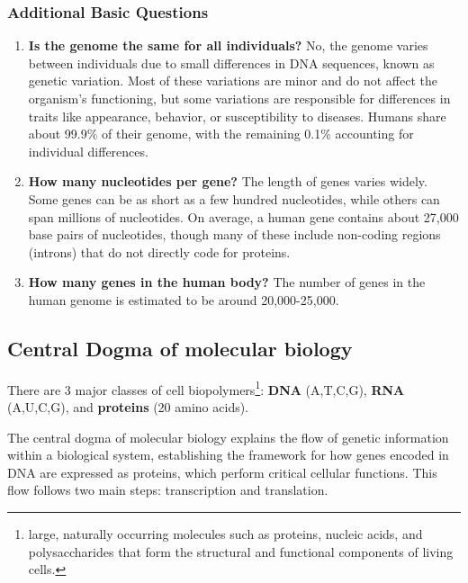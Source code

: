 \documentclass[a4paper]{article}
\begin{document}
\subsubsection*{Additional Basic Questions}
\begin{enumerate}
  \item \textbf{Is the genome the same for all individuals?} 
  No, the genome varies between individuals due to small differences in DNA sequences, 
  known as genetic variation. Most of these variations are minor and do 
  not affect the organism's functioning, but some variations are responsible 
  for differences in traits like appearance, behavior, or susceptibility to 
  diseases. Humans share about 99.9\% of their genome, with the remaining 0.1\% 
  accounting for individual differences.

  \item \textbf{How many nucleotides per gene?}
  The length of genes varies widely. Some genes can be as short as a few 
  hundred nucleotides, while others can span millions of nucleotides. 
  On average, a human gene contains about 27,000 base pairs of nucleotides, 
  though many of these include non-coding regions (introns) that do not 
  directly code for proteins.

  \item \textbf{How many genes in the human body?}
  The number of genes in the human genome is estimated to be around 
  20,000-25,000.
\end{enumerate}

\subsection*{Central Dogma of molecular biology}

There are 3 major classes of cell biopolymers\footnote{large, naturally 
occurring molecules such as proteins, nucleic acids, and polysaccharides 
that form the structural and functional components of living cells.}:
\textbf{DNA} (A,T,C,G), \textbf{RNA} (A,U,C,G), and \textbf{proteins} (20 amino acids). 

The central dogma of molecular biology explains the flow of genetic information within a biological system, establishing the framework for how genes encoded in DNA are expressed as proteins, which perform critical cellular functions. This flow follows two main steps: transcription and translation.
\end{document}
